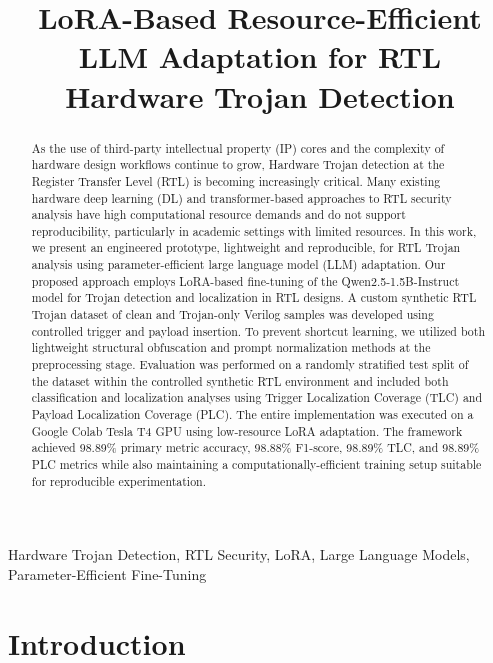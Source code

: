 \documentclass[conference]{IEEEtran}
\title{LoRA-Based Resource-Efficient LLM Adaptation for RTL Hardware Trojan Detection}
\begin{document}
\maketitle


\begin{abstract}
As the use of third-party intellectual property (IP) cores and the complexity of hardware design workflows continue to grow, Hardware Trojan detection at the Register Transfer Level (RTL) is becoming increasingly critical. Many existing hardware deep learning (DL) and transformer-based approaches to RTL security analysis have high computational resource demands and do not support reproducibility, particularly in academic settings with limited resources. In this work, we present an engineered prototype, lightweight and reproducible, for RTL Trojan analysis using parameter-efficient large language model (LLM) adaptation. Our proposed approach employs LoRA-based fine-tuning of the Qwen2.5-1.5B-Instruct model for Trojan detection and localization in RTL designs. A custom synthetic RTL Trojan dataset of clean and Trojan-only Verilog samples was developed using controlled trigger and payload insertion. To prevent shortcut learning, we utilized both lightweight structural obfuscation and prompt normalization methods at the preprocessing stage. Evaluation was performed on a randomly stratified test split of the dataset within the controlled synthetic RTL environment and included both classification and localization analyses using Trigger Localization Coverage (TLC) and Payload Localization Coverage (PLC). The entire implementation was executed on a Google Colab Tesla T4 GPU using low-resource LoRA adaptation. The framework achieved 98.89\% primary metric accuracy, 98.88\% F1-score, 98.89\% TLC, and 98.89\% PLC metrics while also maintaining a computationally-efficient training setup suitable for reproducible experimentation.
\end{abstract}

\begin{IEEEkeywords}
Hardware Trojan Detection,
RTL Security,
LoRA,
Large Language Models,
Parameter-Efficient Fine-Tuning
\end{IEEEkeywords}

\section{Introduction}
\label{sec:introduction}
\end{document}
